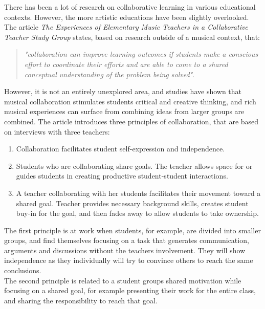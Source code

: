 There has been a lot of research on collaborative learning in various educational contexts. However, the more artistic educations have been slightly overlooked\cite{collaborativeLearningTeachers}\cite{collaborativeMusicAnalysis}\cite{collaborativeLearningReview}. 
The article \textit{The Experiences of Elementary Music Teachers in a Collaborative Teacher Study Group} states, based on research outside of a musical context, that:\\
\begin{quote}
	\textit{"collaboration can improve learning outcomes if students make a conscious effort to coordinate their efforts and are able to come to a shared conceptual understanding of the problem being solved"}\cite{collaborativeLearningTeachers}.\\
\end{quote}
However, it is not an entirely unexplored area, and studies have shown that musical collaboration stimulates students critical and creative thinking, and rich musical experiences can surface from combining ideas from larger groups are combined\cite{collaborativeLearningTeachers}. 
The article introduces three principles of collaboration, that are based on interviews with three teachers:\\
\begin{enumerate}
	\item Collaboration facilitates student self-expression and independence.
	\item Students who are collaborating share goals. The teacher allows space for or guides students in creating productive student-student interactions.
	\item A teacher collaborating with her students facilitates their movement toward a shared goal. Teacher provides necessary background skills, creates student buy-in for the goal, and then fades away to allow students to take ownership.\\
\end{enumerate}
The first principle is at work when students, for example, are divided into smaller groups, and find themselves focusing on a task that generates communication, arguments and discussions without the teachers involvement. They will show independence as they individually will try to convince others to reach the same conclusions.\\

The second principle is related to a student groups shared motivation while focusing on a shared goal, for example presenting their work for the entire class, and sharing the responsibility to reach that goal.\\


